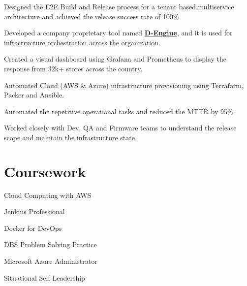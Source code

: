 \documentclass[a4paper]{deedy-resume-openfont}
\begin{document}
\begin{tightemize}
\item Designed the E2E Build and Release process for a tenant based multiservice architecture and achieved the release success rate of 100\%.
\item Developed a company proprietary tool named \href{https://www.youtube.com/watch?v=YWLU2OU13tA}{\bf D-Engine}, and it is used for infrastructure orchestration across the organization.
\item Created a visual dashboard using Grafana and Prometheus to display the response from 32k+ stores across the country.
\item Automated Cloud (AWS \& Azure) infrastructure provisioning using Terraform, Packer and Ansible.
\item Automated the repetitive operational tasks and reduced the MTTR by 95\%.
\item Worked closely with Dev, QA and Firmware teams to understand the release scope and maintain the infrastructure state.
\end{tightemize}

\section{Coursework}
\vspace{\topsep}
\begin{tightemize}
\item Cloud Computing with AWS \\
\item Jenkins Professional \\
\item Docker for DevOps \\
\item DBS Problem Solving Practice \\
\item Microsoft Azure Administrator \\
\item Situational Self Leadership
\end{tightemize}
\sectionsep


\end{document}
